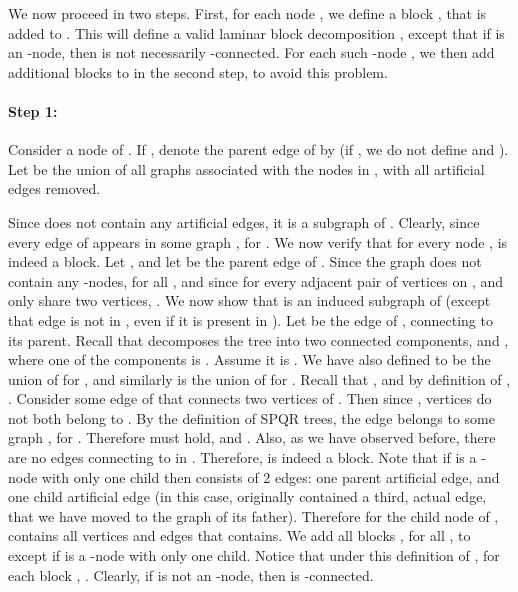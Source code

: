\documentclass[twoside,leqno,twocolumn]{article}
\begin{document}
We now proceed in two steps. First, for each node , we define a block , that is added to . This will define a valid laminar block decomposition , except that if  is an -node, then  is not necessarily -connected. For each such -node , we then add additional blocks to  in the second step, to avoid this problem.

\paragraph{Step 1:}
Consider a node  of . If , denote the parent edge of  by 
 (if , we do not define  and ). Let  be the union
of all graphs  associated with the nodes  in , with all artificial 
edges removed. 

Since  does not contain any artificial edges, it is a subgraph of .
Clearly,  since every edge of  appears in some graph , for .
We now verify that for every node ,  is indeed a block. 
Let , and let  be the parent edge of . 
Since the graph does not contain any -nodes,  for all , and since for every adjacent pair  of vertices on ,  and  only share two vertices, .
We now show that  is an induced subgraph of  (except that edge  is not in ,  even if it is present in ).
Let  be the edge of , connecting  to its parent. Recall that  decomposes the tree  into two connected components,  and , where one of the components is . Assume it is . We have also defined  to be the union of  for , and similarly  is the union of  for . Recall that , and by definition of , .
Consider some edge  of  that connects two vertices of . Then since  , vertices  do not both belong to . 
By the definition of SPQR trees, the edge  belongs to some graph , for . Therefore  must hold, and . Also, as we have observed before, there are no edges connecting  to  in . Therefore,  is indeed a block.
Note that if  is a -node with only one child then  consists of 2 edges: one parent artificial edge, and one child artificial edge (in this case, originally  contained a third, actual edge, that we have moved to the graph of its father). Therefore for the child node  of ,  contains all vertices and edges that  contains. We add all blocks , for all , to  except if  is a -node with only one child. Notice that under this definition of , for each block , . Clearly, if  is not an -node, then  is -connected.
\end{document}
